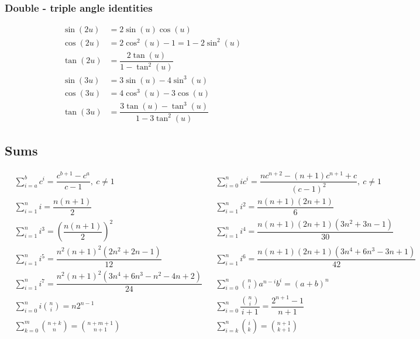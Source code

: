\subsubsection{Double - triple angle identities}
\vspace{-0.6cm}
\begin{align*}
  \sin(2u) &= 2\sin(u)\cos(u) \\
  \cos(2u) &= 2\cos^2(u) - 1 = 1 - 2\sin^2(u) \\
  \tan(2u) &= \dfrac{2\tan(u)}{1-\tan^2(u)} \\
  \sin(3u) &= 3\sin(u) - 4\sin^3(u) \\
  \cos(3u) &= 4\cos^3(u) - 3\cos(u) \\
  \tan(3u) &= \dfrac{3\tan(u) - \tan^3(u)}{1 - 3\tan^2(u)}
\end{align*}

\subsection{Sums}
\vspace{-0.6cm}
\begin{align*}
  &\sum\limits_{i = a}^{b} c^i = \dfrac{c^{b + 1} - c^{a}}{c - 1},\ c \neq 1
  &&\sum\limits_{i = 0}^{n} i c^i = \dfrac{nc^{n + 2} - (n + 1)c^{n + 1} + c}{(c - 1)^2},\ c \neq 1 \\
  &\sum\limits_{i = 1}^{n} i = \dfrac{n(n + 1)}{2}
  &&\sum\limits_{i = 1}^{n} i^2 = \dfrac{n(n + 1)(2n + 1)}{6} \\
  &\sum\limits_{i = 1}^{n} i^3 = \left(\dfrac{n(n + 1)}{2}\right)^2
  &&\sum\limits_{i = 1}^{n} i^4 = \dfrac{n(n + 1)(2n + 1)(3n^2 + 3n - 1)}{30} \\
  &\sum\limits_{i = 1}^{n} i^5 = \dfrac{n^2(n + 1)^2(2n^2 + 2n - 1)}{12}
  &&\sum\limits_{i = 1}^{n} i^6 = \dfrac{n(n + 1)(2n + 1)(3n^4 + 6n^3 - 3n + 1)}{42} \\
  &\sum\limits_{i = 1}^{n} i^7 = \dfrac{n^2(n + 1)^2(3n^4 + 6n^3 - n^2 - 4n + 2)}{24}
  &&\sum\limits_{i = 0}^{n} {\binom{n}{i} a^{n - i} b^i} = (a + b)^n \\
  &\sum\limits_{i = 0}^{n} i \binom{n}{i} = n 2^{n - 1}
  &&\sum\limits_{i = 0}^{n} \dfrac{\binom{n}{i}}{i + 1} = \dfrac{2^{n + 1} - 1}{n + 1} \\
  &\sum\limits_{k = 0}^{m} \binom{n + k}{n} = \binom{n + m + 1}{n + 1}
  &&\sum\limits_{i = k}^{n} \binom{i}{k} = \binom{n + 1}{k + 1} \\
\end{align*}

